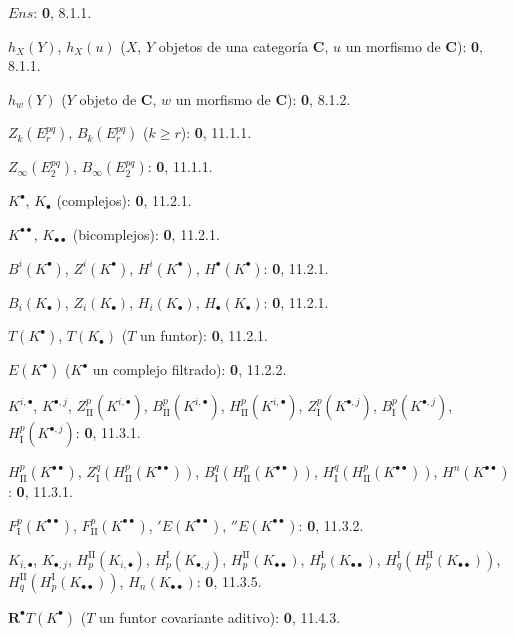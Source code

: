 \begin{flushleft}
$\boldsymbol{\mathit{Ens}}$: \textbf 0, 8.1.1.

$h_X(Y)$, $h_X(u)$ ($X$, $Y$ objetos de una categoría $\boldsymbol{C}$, $u$ un morfismo
de $\boldsymbol{C}$): \textbf 0, 8.1.1.

$h_w(Y)$ ($Y$ objeto de $\boldsymbol{C}$, $w$ un morfismo de $\boldsymbol{C}$): \textbf 0, 8.1.2.

$Z_k(E_r^{pq})$, $B_k(E_r^{pq})$ ($k\geq r$): \textbf 0, 11.1.1.

$Z_\infty(E_2^{pq})$, $B_\infty(E_2^{pq})$: \textbf 0, 11.1.1.

$K^\bullet$, $K_\bullet$ (complejos): \textbf 0, 11.2.1.

$K^{\bullet\bullet}$, $K_{\bullet\bullet}$ (bicomplejos): \textbf 0, 11.2.1.

$B^i(K^\bullet)$, $Z^i(K^\bullet)$, $H^i(K^\bullet)$,
$H^\bullet(K^\bullet)$: \textbf 0, 11.2.1.

$B_i(K_\bullet)$, $Z_i(K_\bullet)$, $H_i(K_\bullet)$,
$H_\bullet(K_\bullet)$: \textbf 0, 11.2.1.

$T(K^\bullet)$, $T(K_\bullet)$ ($T$ un funtor): \textbf 0, 11.2.1.

$E(K^\bullet)$ ($K^\bullet$ un complejo filtrado): \textbf 0, 11.2.2.

$K^{i,\bullet}$, $K^{\bullet,j}$, $Z_{\mathrm{II}}^p(K^{i,\bullet})$,
$B_{\mathrm{II}}^p(K^{i,\bullet})$, $H_{\mathrm{II}}^p(K^{i,\bullet})$,
$Z_{\mathrm I}^p(K^{\bullet,j})$, $B_{\mathrm I}^p(K^{\bullet,j})$,
$H_{\mathrm I}^p(K^{\bullet,j})$: \textbf 0, 11.3.1.

$H_{\mathrm{II}}^p(K^{\bullet\bullet})$,
$Z_{\mathrm I}^q(H_{\mathrm{II}}^p(K^{\bullet\bullet}))$,
$B_{\mathrm I}^q(H_{\mathrm{II}}^p(K^{\bullet\bullet}))$,
$H_{\mathrm I}^q(H_{\mathrm{II}}^p(K^{\bullet\bullet}))$,
$H^n(K^{\bullet\bullet})$: \textbf 0, 11.3.1.

$F_{\mathrm I}^p(K^{\bullet\bullet})$,
$F_{\mathrm{II}}^p(K^{\bullet\bullet})$, ${}'E(K^{\bullet\bullet})$,
${}''E(K^{\bullet\bullet})$: \textbf 0, 11.3.2.

$K_{i,\bullet}$, $K_{\bullet,j}$, $H_p^{\mathrm{II}}(K_{i,\bullet})$,
$H_p^{\mathrm I}(K_{\bullet,j})$, $H_p^{\mathrm{II}}(K_{\bullet\bullet})$,
$H_p^{\mathrm I}(K_{\bullet\bullet})$,
$H_q^{\mathrm I}(H_p^{\mathrm{II}}(K_{\bullet\bullet}))$,
$H_q^{\mathrm{II}}(H_p^{\mathrm I}(K_{\bullet\bullet}))$,
$H_n(K_{\bullet\bullet})$: \textbf 0, 11.3.5.

$\mathbf R^\bullet T(K^\bullet)$ ($T$ un funtor covariante aditivo): \textbf 0, 11.4.3.


\end{flushleft}
